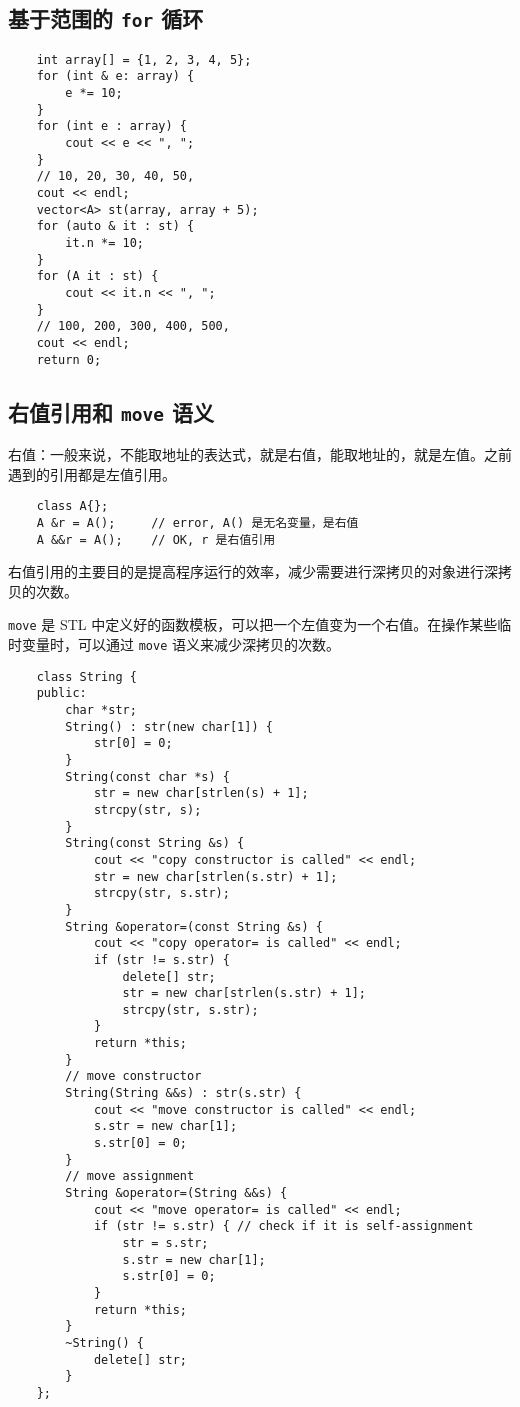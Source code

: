\documentclass[UTF8]{ctexart}
\begin{document}
\subsection{基于范围的 \texttt{for} 循环}
\begin{verbatim}
    int array[] = {1, 2, 3, 4, 5};
    for (int & e: array) {
        e *= 10;
    }
    for (int e : array) {
        cout << e << ", ";
    }
    // 10, 20, 30, 40, 50,
    cout << endl;
    vector<A> st(array, array + 5);
    for (auto & it : st) {
        it.n *= 10;
    }
    for (A it : st) {
        cout << it.n << ", ";
    }
    // 100, 200, 300, 400, 500,
    cout << endl;
    return 0;
\end{verbatim}

\subsection{右值引用和 \texttt{move} 语义}
右值：一般来说，不能取地址的表达式，就是右值，能取地址的，就是左值。之前遇到的引用都是左值引用。
\begin{verbatim}
    class A{};
    A &r = A();     // error, A() 是无名变量，是右值
    A &&r = A();    // OK, r 是右值引用
\end{verbatim}

右值引用的主要目的是提高程序运行的效率，减少需要进行深拷贝的对象进行深拷贝的次数。

\texttt{move} 是 STL 中定义好的函数模板，可以把一个左值变为一个右值。在操作某些临时变量时，可以通过 \texttt{move}
语义来减少深拷贝的次数。
\begin{verbatim}
    class String {
    public:
        char *str;
        String() : str(new char[1]) {
            str[0] = 0;
        }
        String(const char *s) {
            str = new char[strlen(s) + 1];
            strcpy(str, s);
        }
        String(const String &s) {
            cout << "copy constructor is called" << endl;
            str = new char[strlen(s.str) + 1];
            strcpy(str, s.str);
        }
        String &operator=(const String &s) {
            cout << "copy operator= is called" << endl;
            if (str != s.str) {
                delete[] str;
                str = new char[strlen(s.str) + 1];
                strcpy(str, s.str);
            }
            return *this;
        }
        // move constructor
        String(String &&s) : str(s.str) {
            cout << "move constructor is called" << endl;
            s.str = new char[1];
            s.str[0] = 0;
        }
        // move assignment
        String &operator=(String &&s) {
            cout << "move operator= is called" << endl;
            if (str != s.str) { // check if it is self-assignment
                str = s.str;
                s.str = new char[1];
                s.str[0] = 0;
            }
            return *this;
        }
        ~String() {
            delete[] str;
        }
    };
\end{verbatim}
\end{document}
